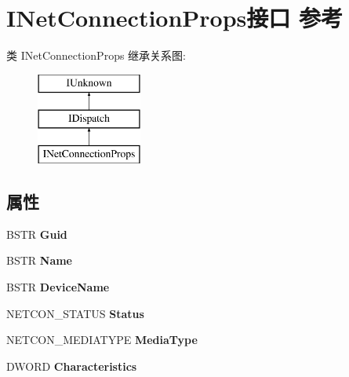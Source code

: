 \hypertarget{interface_i_net_connection_props}{}\section{I\+Net\+Connection\+Props接口 参考}
\label{interface_i_net_connection_props}
类 I\+Net\+Connection\+Props 继承关系图\+:\begin{figure}[H]
\begin{center}
\leavevmode
\includegraphics[height=3.000000cm]{interface_i_net_connection_props}
\end{center}
\end{figure}
\subsection*{属性}
\begin{DoxyCompactItemize}
\item 
\mbox{\label{interface_i_net_connection_props_afd2e7accc0fc5be389580bbceb6193ab}} 
B\+S\+TR {\bfseries Guid}
\item 
\mbox{\label{interface_i_net_connection_props_af7199c1edf27de0098e147921e576d47}} 
B\+S\+TR {\bfseries Name}
\item 
\mbox{\label{interface_i_net_connection_props_aeb9816acdab21039a7f94eb8cad77145}} 
B\+S\+TR {\bfseries Device\+Name}
\item 
\mbox{\label{interface_i_net_connection_props_a0b42f3d2b26a2d538a7981482e2c1de7}} 
N\+E\+T\+C\+O\+N\+\_\+\+S\+T\+A\+T\+US {\bfseries Status}
\item 
\mbox{\label{interface_i_net_connection_props_acdc16a591cf82a943d861b54e0739eb2}} 
N\+E\+T\+C\+O\+N\+\_\+\+M\+E\+D\+I\+A\+T\+Y\+PE {\bfseries Media\+Type}
\item 
\mbox{\label{interface_i_net_connection_props_ae595ca871042181da04dc556370b7296}} 
D\+W\+O\+RD {\bfseries Characteristics}
\end{DoxyCompactItemize}
